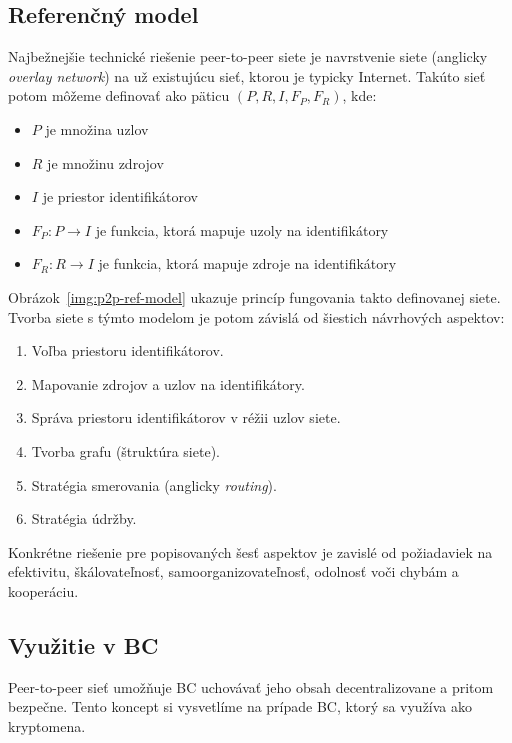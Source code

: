 \subsection{Referenčný model}
Najbežnejšie technické riešenie peer-to-peer siete je navrstvenie siete (anglicky \textit{overlay network}) na už existujúcu sieť, ktorou je typicky Internet. Takúto sieť potom môžeme definovať ako päticu $(P,R,I,F_P,F_R)$, kde:
\begin{itemize}
	\item $P$ je množina uzlov
	\item $R$ je množinu zdrojov
	\item $I$ je priestor identifikátorov
	\item $F_P: P \rightarrow I$ je funkcia, ktorá mapuje uzoly na identifikátory
	\item $F_R: R \rightarrow I$ je funkcia, ktorá mapuje zdroje na identifikátory
\end{itemize}

Obrázok~\ref{img:p2p-ref-model} ukazuje princíp fungovania takto definovanej siete. Tvorba siete s týmto modelom je potom závislá od šiestich návrhových aspektov:
\begin{enumerate}
	\item Voľba priestoru identifikátorov.
	\item Mapovanie zdrojov a uzlov na identifikátory.
	\item Správa priestoru identifikátorov v réžii uzlov siete.
	\item Tvorba grafu (štruktúra siete).
	\item Stratégia smerovania (anglicky \textit{routing}).
	\item Stratégia údržby.
\end{enumerate}
Konkrétne riešenie pre popisovaných šesť aspektov je zavislé od požiadaviek na efektivitu, škálovateľnosť, samoorganizovateľnosť, odolnosť voči chybám a kooperáciu.~\cite{p2pEssence}

\subsection{Využitie v BC}\label{subsec:bc-usage}

Peer-to-peer sieť umožňuje BC uchovávať jeho obsah decentralizovane a pritom bezpečne. Tento koncept si vysvetlíme na prípade BC, ktorý sa využíva ako kryptomena.


